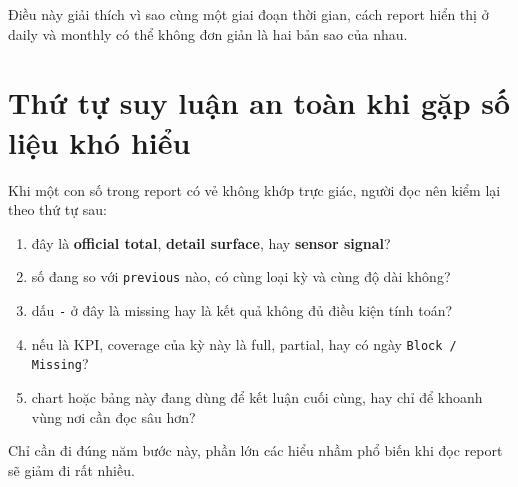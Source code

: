 Điều này giải thích vì sao cùng một giai đoạn thời gian, cách report hiển thị ở daily và monthly có thể không đơn giản là hai bản sao của nhau.

\section{Thứ tự suy luận an toàn khi gặp số liệu khó hiểu}

Khi một con số trong report có vẻ không khớp trực giác, người đọc nên kiểm lại theo thứ tự sau:

\begin{enumerate}[label=-]
\item đây là \textbf{official total}, \textbf{detail surface}, hay \textbf{sensor signal}?
\item số đang so với \texttt{previous} nào, có cùng loại kỳ và cùng độ dài không?
\item dấu \texttt{-} ở đây là missing hay là kết quả không đủ điều kiện tính toán?
\item nếu là KPI, coverage của kỳ này là full, partial, hay có ngày \texttt{Block / Missing}?
\item chart hoặc bảng này đang dùng để kết luận cuối cùng, hay chỉ để khoanh vùng nơi cần đọc sâu hơn?
\end{enumerate}

Chỉ cần đi đúng năm bước này, phần lớn các hiểu nhầm phổ biến khi đọc report sẽ giảm đi rất nhiều.

